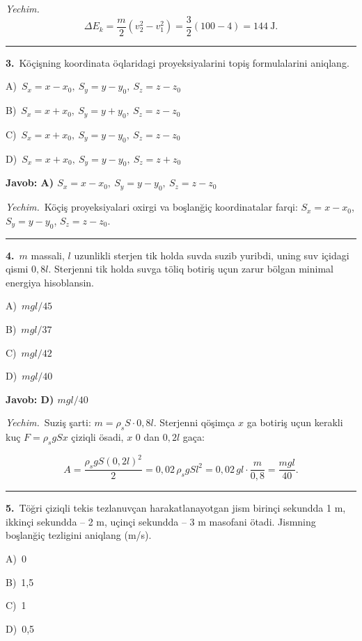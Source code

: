 \documentclass[11pt,a4paper]{article}
\newcommand{\opt}[2]{\hspace*{4mm}#1)\ #2\par}
\begin{document}
\noindent\textit{Yechim.}\ \[\Delta E_k=\frac{m}{2}\left(v_2^2-v_1^2\right)=\frac{3}{2}(100-4)=144\ \text{J}.\]\par\medskip\hrule\medskip
{}\noindent\begin{minipage}{\linewidth}
\textbf{3.}\ Köçişning koordinata öqlaridagi proyeksiyalarini topiş formulalarini aniqlang.\par\smallskip
\opt{A}{$S_x=x-x_0,\ S_y=y-y_0,\ S_z=z-z_0$}
\opt{B}{$S_x=x+x_0,\ S_y=y+y_0,\ S_z=z-z_0$}
\opt{C}{$S_x=x+x_0,\ S_y=y-y_0,\ S_z=z-z_0$}
\opt{D}{$S_x=x+x_0,\ S_y=y-y_0,\ S_z=z+z_0$}
\end{minipage}\vspace{2pt}\par
\noindent\colorbox{gray!12}{\parbox{\dimexpr\linewidth-2\fboxsep}{\textbf{Javob: A) $S_x=x-x_0,\ S_y=y-y_0,\ S_z=z-z_0$}}}\par\smallskip
\noindent\textit{Yechim.}\ Köçiş proyeksiyalari oxirgi va boşlanğiç koordinatalar farqi: $S_x=x-x_0$, $S_y=y-y_0$, $S_z=z-z_0$.\par\par\medskip\hrule\medskip
{}\noindent\begin{minipage}{\linewidth}
\textbf{4.}\ $m$ massali, $l$ uzunlikli sterjen tik holda suvda suzib yuribdi, uning suv içidagi qismi $0{,}8l$. Sterjenni tik holda suvga töliq botiriş uçun zarur bölgan minimal energiya hisoblansin.\par\smallskip
\opt{A}{$mgl/45$}
\opt{B}{$mgl/37$}
\opt{C}{$mgl/42$}
\opt{D}{$mgl/40$}
\end{minipage}\vspace{2pt}\par
\noindent\colorbox{gray!12}{\parbox{\dimexpr\linewidth-2\fboxsep}{\textbf{Javob: D) $mgl/40$}}}\par\smallskip
\noindent\textit{Yechim.}\ Suziş şarti: $m=\rho_s S\cdot0{,}8l$. Sterjenni qöşimça $x$ ga botiriş uçun kerakli kuç $F=\rho_s gSx$ çiziqli ösadi, $x$ $0$ dan $0{,}2l$ gaça:\par
\[A=\frac{\rho_s gS(0{,}2l)^2}{2}=0{,}02\,\rho_s gSl^2=0{,}02\,gl\cdot\frac{m}{0{,}8}=\frac{mgl}{40}.\]\par\medskip\hrule\medskip
{}\noindent\begin{minipage}{\linewidth}
\textbf{5.}\ Töğri çiziqli tekis tezlanuvçan harakatlanayotgan jism birinçi sekundda 1 m, ikkinçi sekundda – 2 m, uçinçi sekundda – 3 m masofani ötadi. Jismning boşlanğiç tezligini aniqlang (m/s).\par\smallskip
\opt{A}{0}
\opt{B}{1,5}
\opt{C}{1}
\opt{D}{0,5}
\end{minipage}\vspace{2pt}\par
\end{document}
